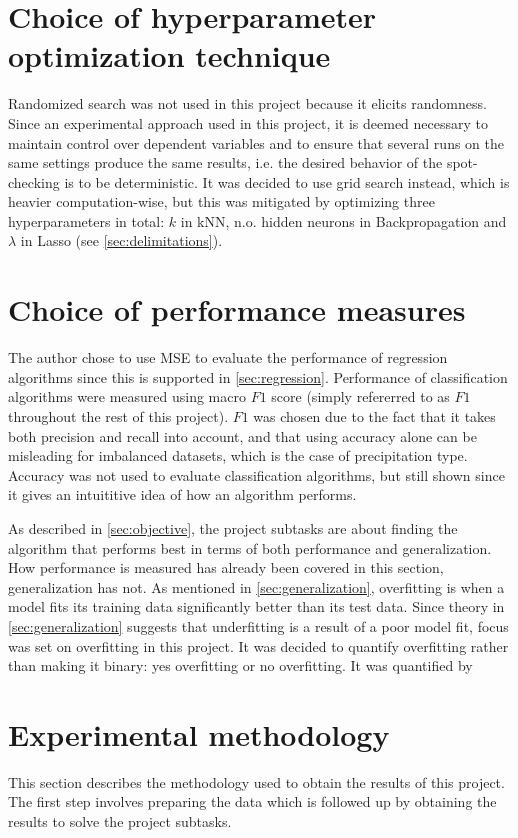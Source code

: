 \section{Choice of hyperparameter optimization technique} \label{sec:hyper_opt_techniques}
	Randomized search was not used in this project because it elicits randomness. Since an experimental approach used in this project, it is deemed necessary to maintain control over dependent variables and to ensure that several runs on the same settings produce the same results, i.e. the desired behavior of the spot-checking is to be deterministic. It was decided to use grid search instead, which is heavier computation-wise, but this was mitigated by optimizing three hyperparameters in total: $k$ in kNN, n.o. hidden neurons in Backpropagation and $\lambda$ in Lasso (see \ref{sec:delimitations}). %

\section{Choice of performance measures}
	The author chose to use MSE to evaluate the performance of regression algorithms since this is supported in \ref{sec:regression}. Performance of classification algorithms were measured using macro $F1$ score (simply refererred to as $F1$ throughout the rest of this project). $F1$ was chosen due to the fact that it takes both precision and recall into account, and that using accuracy alone can be misleading for imbalanced datasets, which is the case of precipitation type. Accuracy was not used to evaluate classification algorithms, but still shown since it gives an intuititive idea of how an algorithm performs.

	As described in \ref{sec:objective}, the project subtasks are about finding the algorithm that performs best in terms of both performance and generalization. How performance is measured has already been covered in this section, generalization has not. As mentioned in \ref{sec:generalization}, overfitting is when a model fits its training data significantly better than its test data. Since theory in \ref{sec:generalization} suggests that underfitting is a result of a poor model fit, focus was set on overfitting in this project. It was decided to quantify overfitting rather than making it binary: yes overfitting or no overfitting. It was quantified by
	

\section{Experimental methodology}
	This section describes the methodology used to obtain the results of this project. The first step involves preparing the data which is followed up by obtaining the results to solve the project subtasks. 

